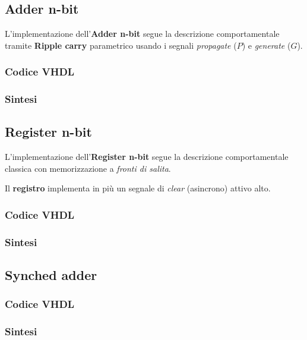 \documentclass[12pt]{article}
\begin{document}
    \subsection{Adder n-bit}
        L'implementazione dell'\textbf{Adder n-bit} segue la descrizione comportamentale tramite \textbf{Ripple carry} parametrico usando i segnali \textit{propagate} ($P$) e \textit{generate} ($G$).

        \subsubsection{Codice VHDL}
            
        \subsubsection{Sintesi}

    \subsection{Register n-bit}
        L'implementazione dell'\textbf{Register n-bit} segue la descrizione comportamentale classica con memorizzazione a \textit{fronti di salita}.
        
        Il \textbf{registro} implementa in più un segnale di \textit{clear} (asincrono) attivo alto.

        \subsubsection{Codice VHDL}
            
        \subsubsection{Sintesi}

    \subsection{Synched adder}

        \subsubsection{Codice VHDL}
        
        \subsubsection{Sintesi}
\end{document}
